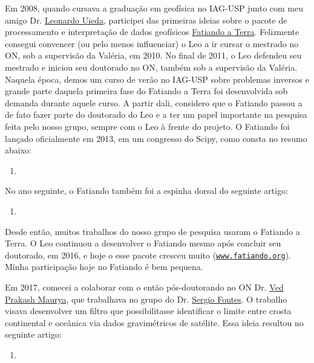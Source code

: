 \noindent Em 2008, quando cursava a graduação em geofísica no IAG-USP junto com meu amigo
Dr. \href{https://www.leouieda.com/}{Leonardo Uieda}, participei das primeiras ideias 
sobre o pacote de processamento e interpretação de dados geofísicos 
\href{https://www.fatiando.org/about/}{\textsf{Fatiando a Terra}}. 
Felizmente consegui convencer (ou pelo menos influenciar) o Leo a ir cursar o mestrado
no ON, sob a supervisão da Valéria, em 2010. 
No final de 2011, o Leo defendeu seu mestrado e iniciou seu doutorado no ON,
também sob a supervisão da Valéria.
Naquela época, demos um curso de verão no IAG-USP sobre problemas inversos e
grande parte daquela primeira fase do Fatiando a Terra foi desenvolvida sob demanda
durante aquele curso.
A partir dali, considero que o Fatiando passou a de fato fazer parte do doutorado 
do Leo e a ter um papel importante na pesquisa feita pelo nosso grupo, sempre com o Leo
à frente do projeto. O Fatiando foi lançado oficialmente em 2013, em um congresso
do Scipy, como consta no resumo abaixo:
\begin{enumerate}
	\item {}
\end{enumerate}
No ano seguinte, o Fatiando também foi a espinha dorsal do seguinte artigo:
\begin{enumerate}
	\item {}
\end{enumerate}
Desde então, muitos trabalhos do nosso grupo de pesquisa usaram o Fatiando a Terra.
O Leo continuou a desenvolver o Fatiando mesmo após concluir seu doutorado, em 2016,
e hoje o esse pacote cresceu muito 
(\href{https://www.fatiando.org/about/}{\texttt{www.fatiando.org}}).
Minha participação hoje no Fatiando é bem pequena.

\bigskip

\noindent Em 2017, comecei a colaborar com o então pós-doutorando no ON Dr.
\href{https://www.researchgate.net/profile/Ved-Maurya}{Ved Prakash Maurya},
que trabalhava no grupo do Dr. 
\href{https://lattes.cnpq.br/8537150955145617}{Sergio Fontes}.
O trabalho visava desenvolver um filtro que possibilitasse identificar o 
limite entre crosta continental e oceânica via dados gravimétricos de satélite.
Essa ideia resultou no seguinte artigo:
\begin{enumerate}
	\item {}
\end{enumerate}

\bigskip

